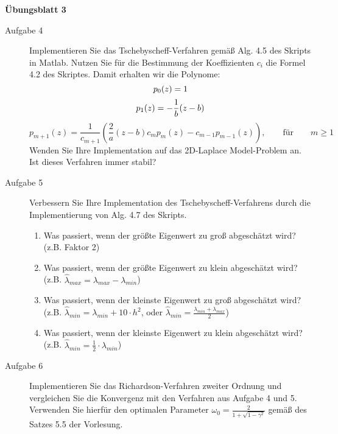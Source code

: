 \documentclass[a4paper,11pt]{scrartcl}
\begin{document}
\aihead

\begin{center}
  {\large\textbf{Übungsblatt 3}}
\end{center}


\begin{description}
    \item[Aufgabe 4] Implementieren Sie das Tschebyscheff-Verfahren gemäß Alg. 4.5 des Skripts in Matlab. Nutzen Sie für die Bestimmung der Koeffizienten $c_i$ die Formel 4.2 des Skriptes. Damit erhalten wir die Polynome:\\
\begin{equation*}
p_0(z) = 1\\
\end{equation*}
\begin{equation*}
p_1(z) = - \frac{1}{b}(z-b)\\
\end{equation*}
\begin{equation*}
p_{m+1}(z) = \frac{1}{c_{m+1}}\left(\frac{2}{a} (z-b) c_m p_m(z) - c_{m-1} p_{m-1}(z)\right), \qquad \text{für} \qquad m \geq 1
\end{equation*} 
     Wenden Sie Ihre Implementation auf das 2D-Laplace Model-Problem an. Ist dieses Verfahren immer stabil?
     
    \item[Aufgabe 5] Verbessern Sie Ihre Implementation des Tschebyscheff-Verfahrens durch die Implementierung von Alg. 4.7 des Skripts. \\
\begin{enumerate}
\item Was passiert, wenn der größte Eigenwert zu groß abgeschätzt wird? (z.B. Faktor 2)
\item Was passiert, wenn der größte Eigenwert zu klein abgeschätzt wird? (z.B. $\hat{\lambda}_{max} = \lambda_{max} - \lambda_{min}$)
\item Was passiert, wenn der kleinste Eigenwert zu groß abgeschätzt wird? (z.B. $\hat{\lambda}_{min} = \lambda_{min} + 10 \cdot h^2$, oder $\hat{\lambda}_{min} = \frac{\lambda_{min} + \lambda_{max}}{2}$)
\item Was passiert, wenn der kleinste Eigenwert zu klein abgeschätzt wird? (z.B. $\hat{\lambda}_{min} = \frac{1}{2} \cdot \lambda_{min}$)
\end{enumerate}

\item[Aufgabe 6] Implementieren Sie das Richardson-Verfahren zweiter Ordnung und vergleichen Sie die Konvergenz mit den Verfahren aus Aufgabe 4 und 5. Verwenden Sie hierfür den optimalen Parameter $\omega_{0} = \frac{2}{1 + \sqrt{1 - \gamma^2}}$ gemäß des Satzes 5.5 der Vorlesung.
    
\end{description}
\end{document}
